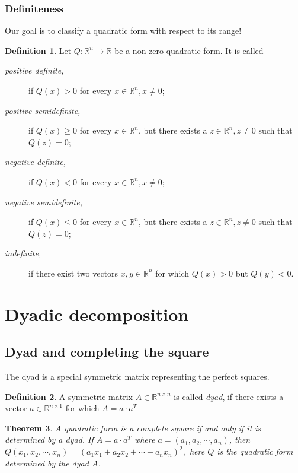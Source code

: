 \documentclass[aspectratio=169,notheorems]{corvinusmetropolis}
\newtheorem{theorem}{Theorem}
\theoremstyle{definition}
\newtheorem{definition}[theorem]{Definition}
\begin{document}
\begin{frame}
    \frametitle{Definiteness}
    Our goal is to classify a quadratic form with respect to its range!
    \begin{definition}
        Let $Q:\mathbb{R}^n\to\mathbb{R}$ be a non-zero quadratic form. It is called
        \begin{description}
            \item[\emph{positive definite,}] if $Q\left( x \right)>0$ for every $x\in\mathbb{R}^n,x\neq 0$;
            \item[\emph{positive semidefinite,}] if $ Q\left( x \right)\geq 0$ for every $x\in\mathbb{R}^n$,
                but there exists a $z\in\mathbb{R}^n, z\neq 0$ such that $Q\left( z \right)=0$;
            \item[\emph{negative definite,}] if $ Q\left( x \right)<0$ for every $x\in\mathbb{R}^n,x\neq 0;$
            \item[\emph{negative semidefinite,}] if $ Q\left( x \right)\leq 0$ for every $x\in\mathbb{R}^n$,
                but there exists a $z\in\mathbb{R}^n, z\neq 0$ such that $Q\left( z \right)=0$;
            \item[\emph{indefinite,}] if there exist two vectors $x,y\in\mathbb{R}^n$ for which
                $Q\left( x \right)>0$ but $Q\left( y \right)<0$.
        \end{description}
    \end{definition}
\end{frame}
\section{Dyadic decomposition}
\subsection{Dyad and completing the square}
\begin{frame}
    The dyad is a special symmetric matrix representing the perfect squares.
    \begin{definition}
        A symmetric matrix $A\in\mathbb{R}^{n\times n}$ is called \alert{\emph{dyad}}, 
        if there exists a vector
        $a\in\mathbb{R}^{n\times 1}$ for which
        \(
            A=a\cdot a^T
        \)
    \end{definition}
    \begin{theorem}
        A quadratic form is a complete square if and only if it is determined by a dyad.
        If $A=a\cdot a^T$ where $a=\left( a_1,a_2,\cdots,a_n \right)$, then
          \(
             Q\left( x_1,x_2,\cdots,x_n \right)=
              \left( a_1x_1+a_2x_2+\cdots+a_nx_n \right)^2,
          \)
        here $Q$ is the quadratic form determined by the dyad $A$.
    \end{theorem}
\end{frame}
\end{document}
